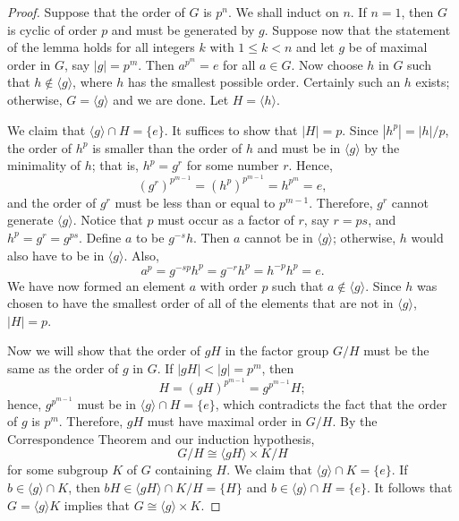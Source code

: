  
 
\begin{proof}
Suppose that the order of $G$ is $p^n$.  We shall induct on $n$. If
$n= 1$, then $G$ is cyclic of order $p$ and must be generated by $g$.
Suppose now that the statement of the lemma holds for all integers $k$
with $1 \leq k < n$ and let $g$ be of maximal order in $G$, say
$|g| = p^{m}$.  Then $a^{p^m} = e$ for all $a \in G$. Now choose $h$
in $G$ such that $h \notin \langle g \rangle$, where $h$ has the
smallest possible order.  Certainly such an $h$ exists; otherwise, $G
= \langle g \rangle$ and we are done.  Let $H = \langle h \rangle$.
 
 
We claim that $\langle g \rangle \cap H = \{ e \}$. It suffices to
show that $|H|=p$.  Since $|h^p| = |h| / p$, the order of $h^p$ is
smaller than the order of $h$ and must be in $\langle g \rangle$ by
the minimality of $h$; that is, $h^p = g^r$ for some number $r$.
Hence, 
\[
(g^r)^{p^{m-1}} = (h^p)^{p^{m-1}} = h^{p^{m}} = e,
\]
and the order of $g^r$ must be less than or equal to $p^{m-1}$.
Therefore, $g^r$ cannot generate $\langle g \rangle$.  Notice that $p$
must occur as a factor of $r$, say $r = ps$, and $h^p = g^r = g^{ps}$.
Define $a$ to be $g^{-s}h$. Then $a$ cannot be in $\langle g \rangle$;
otherwise, $h$ would also have to be in $\langle g \rangle$. Also, 
\[
a^p = g^{-sp} h^p = g^{-r} h^p = h^{-p} h^p = e.
\]
We have now formed an element $a$ with order $p$ such that $a \notin
\langle g \rangle$. Since $h$ was chosen to have the smallest order of
all of the elements that are not in $\langle g \rangle$, $|H|  = p$.
 
 
Now we will show that the order of $gH$ in the factor group $G/H$ 
must be the same as the order of $g$ in $G$.  If $|gH| < |g| = 
p^m$, then
\[
H = (gH)^{p^{m-1}} =  g^{p^{m-1}} H;
\]
hence, $g^{p^{m-1}}$ must be in $\langle g \rangle \cap H = \{ e \}$,
which contradicts the fact that the order of $g$ is $p^m$.  Therefore,
$gH$ must have maximal order in $G/H$.  By the Correspondence Theorem
and our induction hypothesis,
\[
G/H \cong \langle gH \rangle \times K/H
\]
for some subgroup $K$ of $G$ containing $H$.  We
claim that $\langle g \rangle \cap K = \{ e \}$. If $b \in \langle g
\rangle \cap K$, then $bH \in \langle gH \rangle \cap K/H =  \{ H \}$ and
$b \in \langle g \rangle \cap H = \{ e \}$. It follows that $G =
\langle g \rangle K$ implies that $G \cong \langle g \rangle \times K$. 
\end{proof}
 
